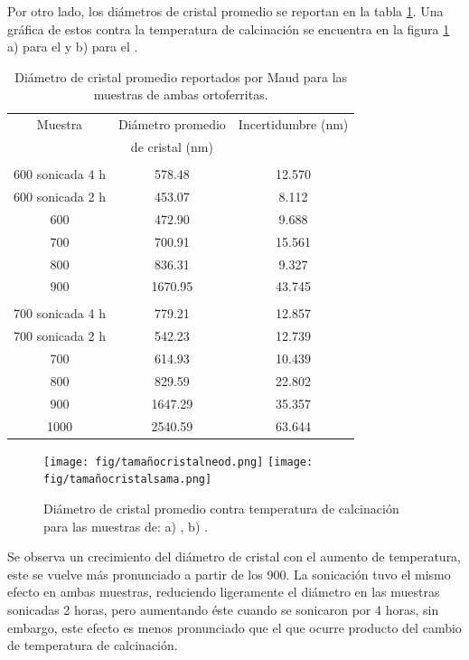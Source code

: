 \documentclass[../main.tex]{subfiles}
\begin{document}
Por otro lado, los diámetros de cristal promedio se reportan en la tabla \ref{tabla:tamañoscristal}. Una gráfica de estos contra la temperatura de calcinación se encuentra en la figura \ref{fig:tamañoscristal} a) para el \neod{} y b) para el \sama{}.
\begin{table}[H]
    \centering
    \begin{tabular}{|c||c|c|}
        \hline
        Muestra & Diámetro promedio  & Incertidumbre (nm) \\
        & de cristal (nm) & \\
        \hline\hline
        \multicolumn{3}{|c|}{\neod{}} \\
        \hline
        600\gradoC{} sonicada 4 h & 578.48 & 12.570 \\
        \hline
        600\gradoC{} sonicada 2 h & 453.07 & 8.112 \\
        \hline
        600\gradoC{} & 472.90 & 9.688 \\
        \hline
        700\gradoC{} & 700.91 & 15.561 \\
        \hline
        800\gradoC{} & 836.31 & 9.327 \\
        \hline
        900\gradoC{} & 1670.95 & 43.745 \\
        \hline
        \multicolumn{3}{|c|}{\sama{}} \\
        \hline
        700\gradoC{} sonicada 4 h & 779.21 & 12.857 \\
        \hline
        700\gradoC{} sonicada 2 h & 542.23 & 12.739 \\
        \hline
        700\gradoC{} & 614.93 & 10.439 \\
        \hline
        800\gradoC{} & 829.59 & 22.802 \\
        \hline
        900\gradoC{} & 1647.29 & 35.357 \\
        \hline
        1000\gradoC{} & 2540.59 & 63.644 \\
        \hline
        \end{tabular} 
    \caption{Diámetro de cristal promedio reportados por Maud para las muestras de ambas ortoferritas.}
    \label{tabla:tamañoscristal}
\end{table}
\begin{figure}[H]
    \centering
    \texttt{[image: fig/tamañocristalneod.png]}
    \quad
    \texttt{[image: fig/tamañocristalsama.png]}
    \caption{Diámetro de cristal promedio contra temperatura de calcinación para las muestras de: a) \neod, b) \sama.}
    \label{fig:tamañoscristal}
\end{figure}
Se observa un crecimiento del diámetro de cristal con el aumento de temperatura, este se vuelve más pronunciado a partir de los 900\gradoC{}. La sonicación tuvo el mismo efecto en ambas muestras, reduciendo ligeramente el diámetro en las muestras sonicadas 2 horas, pero aumentando éste cuando se sonicaron por 4 horas, sin embargo, este efecto es menos pronunciado que el que ocurre producto del cambio de temperatura de calcinación.
\end{document}
